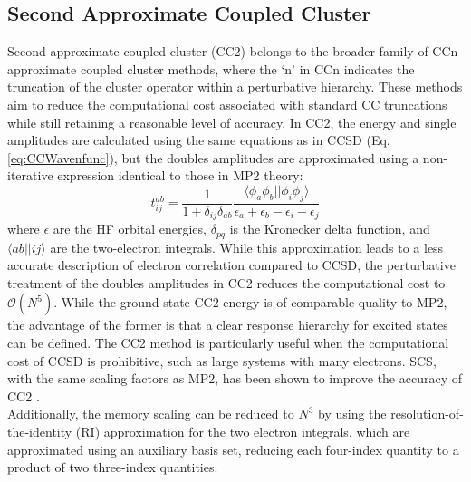
\subsection{Second Approximate Coupled Cluster}\label{sec:CC2Theory}
Second approximate coupled cluster (CC2)\cite{hattig2000cc2,christiansen1995second,shavitt2009many} belongs to the broader family of CCn approximate coupled cluster methods, where the `n' in CCn indicates the truncation of the cluster operator within a perturbative hierarchy. These methods aim to reduce the computational cost associated with standard CC truncations while still retaining a reasonable level of accuracy. In CC2, the energy and single amplitudes are calculated using the same equations as in CCSD (Eq. \ref{eq:CCWavenfunc}), but the doubles amplitudes are approximated using a non-iterative expression identical to those in MP2 theory:
\begin{equation}\label{CC2Energy}
    t^{ab}_{ij} = \frac{1}{1+\delta_{ij}\delta_{ab}}\frac{\langle \phi_a \phi_b || \phi_i \phi_j \rangle}{\epsilon_a + \epsilon_b - \epsilon_i - \epsilon_j}
\end{equation}
where $\epsilon$ are the HF orbital energies, $\delta_{pq}$ is the Kronecker delta function, and $\langle a b || i j \rangle$ are the two-electron integrals. While this approximation leads to a less accurate description of electron correlation compared to CCSD, the perturbative treatment of the doubles amplitudes in CC2 reduces the computational cost to $\mathcal{O}(N^{5})$. While the ground state CC2 energy is of comparable quality to MP2, the advantage of the former is that a clear response hierarchy for excited states can be defined. The CC2 method is particularly useful when the computational cost of CCSD is prohibitive, such as large systems with many electrons. SCS, with the same scaling factors as MP2, has been shown to improve the accuracy of CC2 \cite{grimme2003improved,paran2024performance,shaalan2022accurate}.\\

Additionally, the memory scaling can be reduced to $N^3$ by using the resolution-of-the-identity (RI) approximation for the two electron integrals, which are approximated using an auxiliary basis set, reducing each four-index quantity to a product of two three-index quantities\cite{hattig2000cc2}.\\

